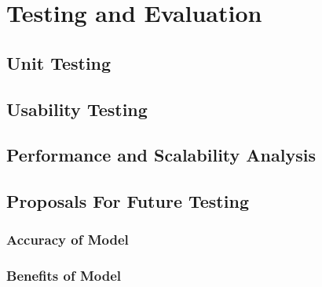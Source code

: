\chapter{Testing and Evaluation}
  \section{Unit Testing}
  \section{Usability Testing}
  \section{Performance and Scalability Analysis}
  \section{Proposals For Future Testing}
    \subsection{Accuracy of Model}
    \subsection{Benefits of Model}
